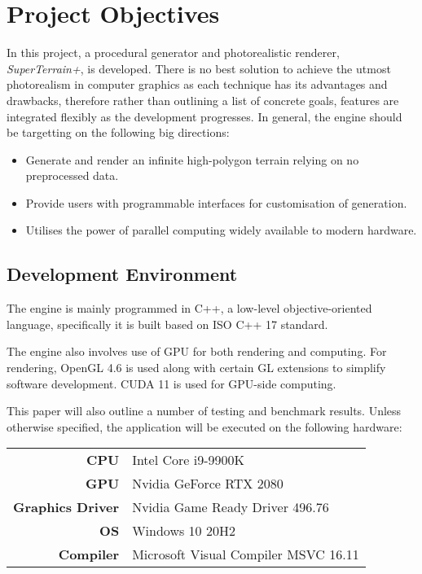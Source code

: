 \documentclass[oneside, a4paper]{report}
\begin{document}
    \section{Project Objectives}

    In this project, a procedural generator and photorealistic renderer, \textit{SuperTerrain+}, is developed. There is no best solution to achieve the utmost photorealism in computer graphics as each technique has its advantages and drawbacks, therefore rather than outlining a list of concrete goals, features are integrated flexibly as the development progresses. In general, the engine should be targetting on the following big directions:

    \begin{itemize}[label=\(\diamond\)]
        \item Generate and render an infinite high-polygon terrain relying on no preprocessed data.
        \item Provide users with programmable interfaces for customisation of generation.
        \item Utilises the power of parallel computing widely available to modern hardware.
    \end{itemize}

    \subsection{Development Environment}

    The engine is mainly programmed in C++, a low-level objective-oriented language, specifically it is built based on ISO C++ 17 standard.
    
    The engine also involves use of GPU for both rendering and computing. For rendering, OpenGL 4.6 is used along with certain GL extensions to simplify software development. CUDA 11 is used for GPU-side computing.

    This paper will also outline a number of testing and benchmark results. Unless otherwise specified, the application will be executed on the following hardware:

    \begin{center}
        \begin{tabular}{rl}
            \textbf{CPU} & Intel Core i9-9900K \\
            \textbf{GPU} & Nvidia GeForce RTX 2080 \\
            \textbf{Graphics Driver} & Nvidia Game Ready Driver 496.76 \\
            \textbf{OS} & Windows 10 20H2 \\
            \textbf{Compiler} & Microsoft Visual Compiler MSVC 16.11
        \end{tabular}
    \end{center}
\end{document}
